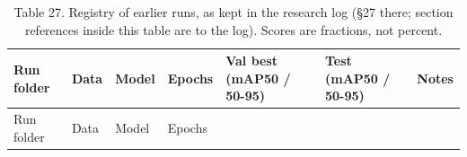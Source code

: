 \documentclass[
  10pt,
]{article}
\begin{document}
\begin{longtable}[]{@{}
  >{\raggedright\arraybackslash}p{}
  >{\raggedright\arraybackslash}p{}
  >{\raggedright\arraybackslash}p{}
  >{\raggedright\arraybackslash}p{}
  >{\raggedright\arraybackslash}p{}
  >{\raggedright\arraybackslash}p{}
  >{\raggedright\arraybackslash}p{}@{}}
\caption{Table 27. Registry of earlier runs, as kept in the research log
(§27 there; section references inside this table are to the log). Scores
are fractions, not percent.}\tabularnewline
\toprule\noalign{}
\begin{minipage}[b]{\linewidth}\raggedright
Run folder
\end{minipage} & \begin{minipage}[b]{\linewidth}\raggedright
Data
\end{minipage} & \begin{minipage}[b]{\linewidth}\raggedright
Model
\end{minipage} & \begin{minipage}[b]{\linewidth}\raggedright
Epochs
\end{minipage} & \begin{minipage}[b]{\linewidth}\raggedright
Val best (mAP50 / 50-95)
\end{minipage} & \begin{minipage}[b]{\linewidth}\raggedright
Test (mAP50 / 50-95)
\end{minipage} & \begin{minipage}[b]{\linewidth}\raggedright
Notes
\end{minipage} \\
\midrule\noalign{}
\endfirsthead
\toprule\noalign{}
\begin{minipage}[b]{\linewidth}\raggedright
Run folder
\end{minipage} & \begin{minipage}[b]{\linewidth}\raggedright
Data
\end{minipage} & \begin{minipage}[b]{\linewidth}\raggedright
Model
\end{minipage} & \begin{minipage}[b]{\linewidth}\raggedright
Epochs
\end{minipage} & \begin{minipage}[b]{\linewidth}\raggedright

\end{minipage}
\end{longtable}
\end{document}
